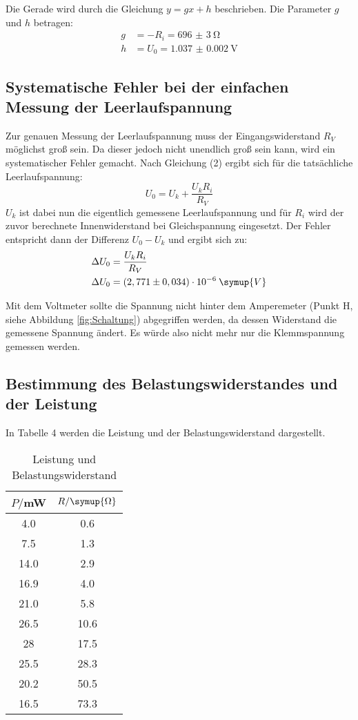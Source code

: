 Die Gerade wird durch die Gleichung $y = gx + h$ beschrieben. Die Parameter $g$ und $h$ betragen:
\begin{align*}
  g &= -R_i = \SI{696(3)}{\ohm}   \\
  h &= U_0 = \SI{1.037(2)}{\volt}
\end{align*}

\subsection{Systematische Fehler bei der einfachen Messung der Leerlaufspannung}
Zur genauen Messung der Leerlaufspannung muss der Eingangswiderstand $R_V$ möglichst groß sein.
Da dieser jedoch nicht unendlich groß sein kann, wird ein systematischer Fehler gemacht.
Nach Gleichung (2) ergibt sich für die tatsächliche Leerlaufspannung:
\begin{equation*}
  U_0 = U_k + \frac{U_kR_i}{R_V}
\end{equation*}
$U_k$ ist dabei nun die eigentlich gemessene Leerlaufspannung und für $R_i$ wird
der zuvor berechnete Innenwiderstand bei Gleichspannung eingesetzt.
Der Fehler entspricht dann der Differenz $U_0 - U_k$ und ergibt sich zu:
\begin{align*}
  \Delta U_0 &= \frac{U_kR_i}{R_V} \\
  \Delta U_0 &= (2,771 \pm 0,034)\cdot 10^{-6} \: \symup{V}
\end{align*}

Mit dem Voltmeter sollte die Spannung nicht hinter dem Amperemeter (Punkt H, siehe Abbildung \ref{fig:Schaltung}) abgegriffen
werden, da dessen Widerstand die gemessene Spannung ändert. Es würde also nicht mehr nur die
Klemmspannung gemessen werden.




\subsection{Bestimmung des Belastungswiderstandes und der Leistung}
In Tabelle 4 werden die Leistung und der Belastungswiderstand dargestellt.

\begin{table}[H]
  \centering
  \caption{Leistung und Belastungswiderstand}
  \label{tab:Leistung}
  \begin{tabular}{c c}
    \toprule
    $P/$mW & $R/ \symup{\Omega}$ \\
    \midrule
    4.0   &  0.6        \\
    7.5   &  1.3        \\
    14.0  &  2.9        \\
    16.9  &  4.0        \\
    21.0  &  5.8        \\
    26.5  &  10.6        \\
    28    &  17.5        \\
    25.5  &  28.3        \\
    20.2  &  50.5        \\
    16.5  &  73.3        \\
    \bottomrule
  \end{tabular}
\end{table}

